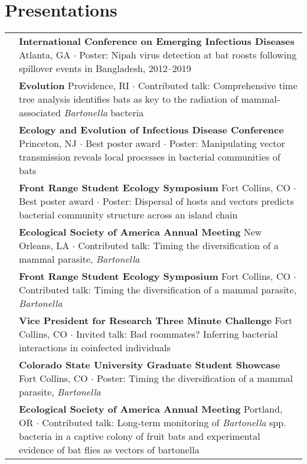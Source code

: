 \documentclass[letterpaper]{deedy-resume} %
\begin{document}
\section{Presentations}
\begin{tabular}{>{\raggedright\arraybackslash}p{2cm}p{16cm}}

2022 & \textbf{International Conference on Emerging Infectious Diseases} Atlanta, GA  $\cdot$ Poster: Nipah virus detection at bat roosts following spillover events in Bangladesh, 2012–2019\\

2019 & \textbf{Evolution} Providence, RI $\cdot$ Contributed talk: Comprehensive time tree analysis identifies bats as key to the radiation of mammal-associated \textit{Bartonella} bacteria\\

2019 & \textbf{Ecology and Evolution of Infectious Disease Conference} Princeton, NJ $\cdot$ \textcolor{special}{Best poster award} $\cdot$ Poster: Manipulating vector transmission reveals local processes in bacterial communities of bats\\

2019 & \textbf{Front Range Student Ecology Symposium} Fort Collins, CO $\cdot$ \textcolor{special}{Best poster award} $\cdot$ Poster: Dispersal of hosts and vectors predicts bacterial community structure across an island chain\\

2018 & \textbf{Ecological Society of America Annual Meeting} New Orleans, LA $\cdot$ Contributed talk: Timing the diversification of a mammal parasite, \textit{Bartonella}\\

2018 & \textbf{Front Range Student Ecology Symposium} Fort Collins, CO $\cdot$ Contributed talk: Timing the diversification of a mammal parasite, \textit{Bartonella}\\

2018 & \textbf{Vice President for Research Three Minute Challenge} Fort Collins, CO $\cdot$ Invited talk: Bad roommates? Inferring bacterial interactions in coinfected individuals\\

2017 & \textbf{Colorado State University Graduate Student Showcase} Fort Collins, CO $\cdot$ Poster: Timing the diversification of a mammal parasite, \textit{Bartonella}\\

2017 & \textbf{Ecological Society of America Annual Meeting} Portland, OR $\cdot$ Contributed talk: Long-term monitoring of \textit{Bartonella} spp. bacteria in a captive colony of fruit bats and experimental evidence of bat flies as vectors of bartonella\\


\end{tabular}
\end{document}
